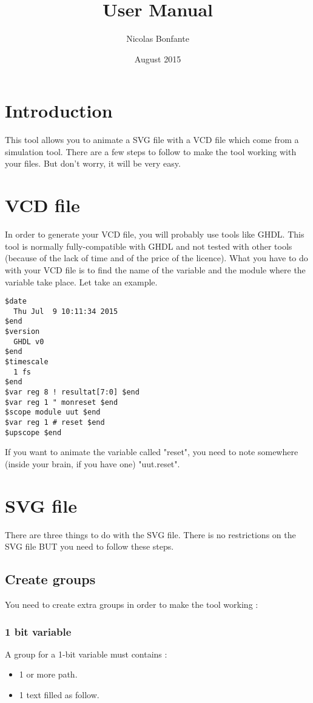 \documentclass{article}
\title{User Manual}
\author{Nicolas Bonfante}
\date{August 2015}
\begin{document}
\maketitle
\tableofcontents
\newpage

\section{Introduction}
This tool allows you to animate a SVG file with a VCD file which come from a simulation tool. There are a few steps to follow to make the tool working with your
files. But don't worry, it will be very easy.

\section{VCD file}
In order to generate your VCD file, you will probably use tools like GHDL. This tool is normally fully-compatible with GHDL and not tested with other tools (because
of the lack of time and of the price of the licence). 
What you have to do with your VCD file is to find the name of the variable and the module where the variable take place. Let take an example.
\begin{lstlisting}
$date
  Thu Jul  9 10:11:34 2015
$end
$version
  GHDL v0
$end
$timescale
  1 fs
$end
$var reg 8 ! resultat[7:0] $end
$var reg 1 " monreset $end
$scope module uut $end
$var reg 1 # reset $end
$upscope $end
\end{lstlisting}
If you want to animate the variable called "reset", you need to note somewhere (inside your brain, if you have one) "uut.reset".

\section{SVG file}
There are three things to do with the SVG file. There is no restrictions on the SVG file BUT you need to follow these steps.
\subsection{Create groups}
You need to create extra groups in order to make the tool working :
\subsubsection{1 bit variable}
A group for a 1-bit variable must contains : 
\begin{itemize}
\item 1 or more path.
\item 1 text filled as follow.
\end{itemize}
\end{document}
